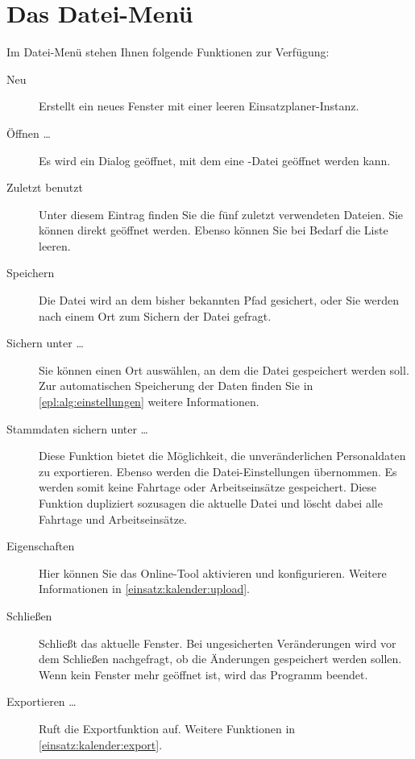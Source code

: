 \section{Das Datei-Menü}
Im Datei-Menü stehen Ihnen folgende Funktionen zur Verfügung:
\begin{description}
  \item[Neu]
  Erstellt ein neues Fenster mit einer leeren Einsatzplaner-Instanz.

  \item[Öffnen \dots]
  Es wird ein Dialog geöffnet, mit dem eine -Datei geöffnet werden kann.

  \item[Zuletzt benutzt]
  Unter diesem Eintrag finden Sie die fünf zuletzt verwendeten Dateien.
  Sie können direkt geöffnet werden.
  Ebenso können Sie bei Bedarf die Liste leeren.

  \item[Speichern]
  Die Datei wird an dem bisher bekannten Pfad gesichert, oder Sie werden nach einem Ort zum Sichern der Datei gefragt.

  \item[Sichern unter \dots]
  Sie können einen Ort auswählen, an dem die Datei gespeichert werden soll.
  Zur automatischen Speicherung der Daten finden Sie in \cref{epl:alg:einstellungen} weitere Informationen.

  \item[Stammdaten sichern unter \dots]
  Diese Funktion bietet die Möglichkeit, die unveränderlichen Personaldaten zu exportieren.
  Ebenso werden die Datei-Einstellungen übernommen.
  Es werden somit keine Fahrtage oder Arbeitseinsätze gespeichert.
  Diese Funktion dupliziert sozusagen die aktuelle Datei und löscht dabei alle Fahrtage und Arbeitseinsätze.


  \item[Eigenschaften]
  Hier können Sie das Online-Tool aktivieren und konfigurieren.
  Weitere Informationen in \cref{einsatz:kalender:upload}.

  \item[Schließen]
  Schließt das aktuelle Fenster.
  Bei ungesicherten Veränderungen wird vor dem Schließen nachgefragt, ob die Änderungen gespeichert werden sollen.
  Wenn kein Fenster mehr geöffnet ist, wird das Programm beendet.

  \item[Exportieren \dots]
  Ruft die Exportfunktion auf.
  Weitere Funktionen in \cref{einsatz:kalender:export}.
\end{description}


